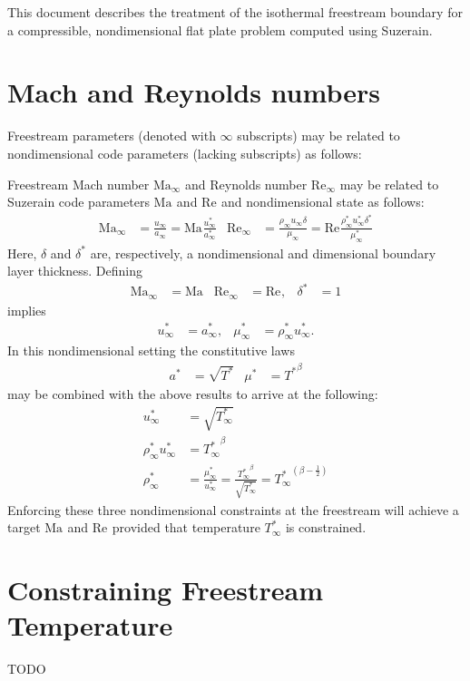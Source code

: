 \documentclass[letterpaper,11pt,nointlimits,reqno]{amsart}
\newcommand{\Mach}[1][]{\ensuremath{\mbox{Ma}_{#1}}}
\newcommand{\Reynolds}[1][]{\ensuremath{\mbox{Re}_{#1}}}
\begin{document}
This document describes the treatment of the isothermal freestream boundary for
a compressible, nondimensional flat plate problem computed using Suzerain.

\section{Mach and Reynolds numbers}

Freestream parameters (denoted with $\infty$ subscripts) may be related
to nondimensional code parameters (lacking subscripts) as follows:

Freestream Mach number $\Mach[\infty]$ and Reynolds number $\Reynolds[\infty]$
may be related to Suzerain code parameters $\Mach$ and $\Reynolds$ and
nondimensional state as follows:
\begin{align}
  \Mach[\infty]{}
  &=         \frac{u_\infty     }{a_\infty     }
   = \Mach{} \frac{u_\infty^\ast}{a_\infty^\ast}
&
  \Reynolds[\infty]{}
  &=             \frac{\rho_\infty      u_\infty      \delta     }{\mu_\infty     }
   = \Reynolds{} \frac{\rho_\infty^\ast u_\infty^\ast \delta^\ast}{\mu_\infty^\ast}
\end{align}
Here, $\delta$ and $\delta^\ast$ are, respectively, a nondimensional and
dimensional boundary layer thickness.
Defining
\begin{align}
  \Mach[\infty]{} &= \Mach
& \Reynolds[\infty]{} &= \Reynolds,
& \delta^\ast &= 1
\end{align}
implies
\begin{align}
  u_\infty^\ast   &= a_\infty^\ast,
& \mu_\infty^\ast &= \rho_\infty^\ast u_\infty^\ast
.
\end{align}
In this nondimensional setting the constitutive laws
\begin{align}
  a^\ast &= \sqrt{T^\ast}
& \mu^\ast &= {T^\ast}^\beta
\end{align}
may be combined with the above results to arrive at the following:
\begin{align}
  u_\infty^\ast &= \sqrt{T_\infty^\ast}
\\
  \rho_\infty^\ast u_\infty^\ast &= {T_\infty^\ast}^\beta
\\
  \rho_\infty^\ast &= \frac{\mu_\infty^\ast}{u_\infty^\ast}
                    = \frac{{T_\infty^\ast}^\beta}{\sqrt{T_\infty^\ast}}
                    = {T_\infty^\ast}^{\left(\beta-\frac{1}{2}\right)}
\end{align}
Enforcing these three nondimensional constraints at the freestream will achieve
a target $\Mach$ and $\Reynolds$ provided that temperature $T_\infty^\ast$ is
constrained.

\section{Constraining Freestream Temperature}

TODO
\end{document}
